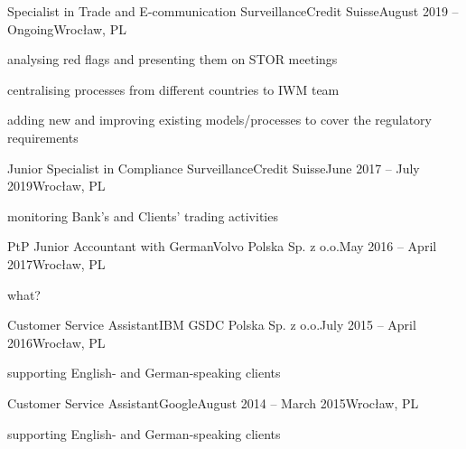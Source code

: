 
\begin{cveventi}{Specialist in Trade and E-communication Surveillance}{Credit Suisse}{August 2019 -- Ongoing}{Wroc\l aw, PL}
	\item analysing red flags and presenting them on STOR meetings
	\item centralising processes from different countries to IWM team
	\item adding new and improving existing models/processes to cover the regulatory requirements
\end{cveventi}
%
\divider
\begin{cveventis}{Junior Specialist in Compliance Surveillance}{Credit Suisse}{June 2017 -- July 2019}{Wroc\l aw, PL}
	\item monitoring Bank’s and Clients' trading activities
\end{cveventis}
%
\divider
%
\begin{cveventis}{PtP Junior Accountant with German}{Volvo Polska Sp. z o.o.}{May 2016 -- April 2017}{Wroc\l aw, PL}
	\item what?
\end{cveventis}
%
\divider
%
\begin{cveventis}{Customer Service Assistant}{IBM GSDC Polska Sp. z o.o.}{July 2015 -- April 2016}{Wroc\l aw, PL}
	\item supporting English- and German-speaking clients
\end{cveventis}
%
\divider
%
\begin{cveventis}{Customer Service Assistant}{Google}{August 2014 -- March 2015}{Wroc\l aw, PL}
	\item supporting English- and German-speaking clients
\end{cveventis}



